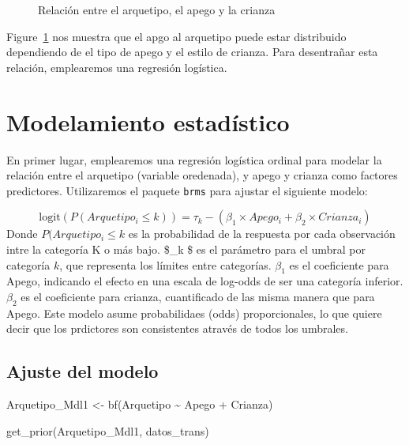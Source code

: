 \documentclass[
  letterpaper,
  DIV=11,
  numbers=noendperiod]{scrartcl}
\newenvironment{Shaded}{\begin{snugshade}}{\end{snugshade}}
\newcommand{\FunctionTok}[1]{\textcolor[rgb]{0.28,0.35,0.67}{#1}}
\newcommand{\NormalTok}[1]{\textcolor[rgb]{0.00,0.23,0.31}{#1}}
\newcommand{\OtherTok}[1]{\textcolor[rgb]{0.00,0.23,0.31}{#1}}
\newcommand{\SpecialCharTok}[1]{\textcolor[rgb]{0.37,0.37,0.37}{#1}}
\begin{document}
\begin{figure}[H]


\caption{\label{fig-Arquetipo_Alluvial}Relación entre el arquetipo, el
apego y la crianza}

\end{figure}%

Figure~\ref{fig-Arquetipo_Alluvial} nos muestra que el apgo al arquetipo
puede estar distribuido dependiendo de el tipo de apego y el estilo de
crianza. Para desentrañar esta relación, emplearemos una regresión
logística.

\section{Modelamiento estadístico}\label{modelamiento-estaduxedstico}

En primer lugar, emplearemos una regresión logística ordinal para
modelar la relación entre el arquetipo (variable oredenada), y apego y
crianza como factores predictores. Utilizaremos el paquete \texttt{brms}
para ajustar el siguiente modelo:

\[
\text{logit}(P(Arquetipo_i \leq k)) = \tau_k - (\beta_1 \times Apego_i + \beta_2 \times Crianza_i)
\] Donde \(P(Arquetipo_i \leq k\) es la probabilidad de la respuesta por
cada observación intre la categoría K o más bajo. \$\tau\_k \$ es el
parámetro para el umbral por categoría \(k\), que representa los límites
entre categorías. \(\beta_1\) es el coeficiente para Apego, indicando el
efecto en una escala de log-odds de ser una categoría inferior.
\(\beta_2\) es el coeficiente para crianza, cuantificado de las misma
manera que para Apego. Este modelo asume probabilidaes (odds)
proporcionales, lo que quiere decir que los prdictores son consistentes
através de todos los umbrales.

\subsection{Ajuste del modelo}\label{ajuste-del-modelo}

\begin{Shaded}
\begin{Highlighting}[]
\NormalTok{Arquetipo\_Mdl1 }\OtherTok{\textless{}{-}} \FunctionTok{bf}\NormalTok{(Arquetipo }\SpecialCharTok{\textasciitilde{}}\NormalTok{ Apego }\SpecialCharTok{+}\NormalTok{ Crianza)}

\FunctionTok{get\_prior}\NormalTok{(Arquetipo\_Mdl1, datos\_trans)}
\end{Highlighting}
\end{Shaded}
\end{document}
